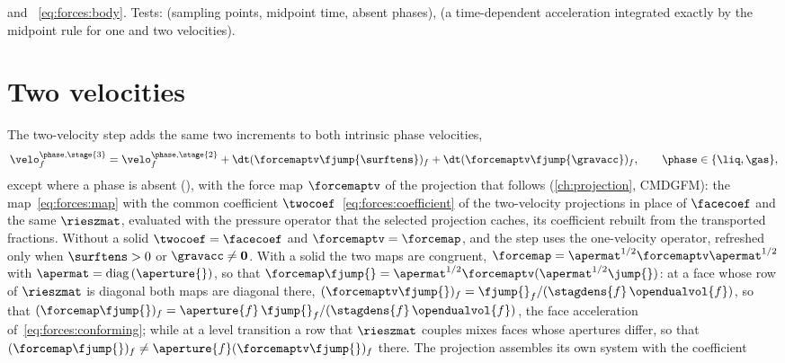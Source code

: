 \begin{implnote}
 and
~\cref{eq:forces:body}.
Tests: 
(sampling points, midpoint time, absent phases),
(a time-dependent acceleration integrated exactly by the midpoint rule for
one and two velocities).
\end{implnote}

\section{Two velocities}\label{sec:forces:two-velocity}
The two-velocity step adds the same two increments to both intrinsic phase
velocities,
\begin{equation}\label{eq:forces:two-velocity}
  \velo^{\phase,\stage{3}}_f=\velo^{\phase,\stage{2}}_f+\dt(\forcemaptv\fjump{\surftens})_f+\dt(\forcemaptv\fjump{\gravacc})_f,
  \qquad \phase\in\{\liq,\gas\},
\end{equation}
except where a phase is absent (), with the force map
$\forcemaptv$ of the projection that follows (\cref{ch:projection}, CMDGFM):
the map~\cref{eq:forces:map} with the common coefficient
$\twocoef$~\cref{eq:forces:coefficient} of the two-velocity projections in
place of $\facecoef$ and the same $\rieszmat$, evaluated with the pressure
operator that the selected projection caches, its coefficient rebuilt from
the transported fractions. Without a solid $\twocoef=\facecoef$ and
$\forcemaptv=\forcemap$, and the step uses the one-velocity operator,
refreshed only when $\surftens>0$ or $\gravacc\neq\mathbf{0}$. With a solid
the two maps are congruent, $\forcemap=\apermat^{1/2}\forcemaptv\apermat^{1/2}$
with $\apermat=\diag{\aperture{}}$, so that
$\forcemap\fjump{}=\apermat^{1/2}\forcemaptv(\apermat^{1/2}\jump{})$: at a
face whose row of $\rieszmat$ is diagonal both maps are diagonal there,
$(\forcemaptv\fjump{})_f=\fjump{}_f/(\stagdens{f}\,\opendualvol{f})$, so that
$(\forcemap\fjump{})_f=\aperture{f}\,\fjump{}_f/(\stagdens{f}\,\opendualvol{f})$,
the face acceleration of~\cref{eq:forces:conforming}; while at a level transition a row that
$\rieszmat$ couples mixes faces whose apertures differ, so that
$(\forcemap\fjump{})_f\neq\aperture{f}(\forcemaptv\fjump{})_f$ there.
The projection assembles its own system with the coefficient
